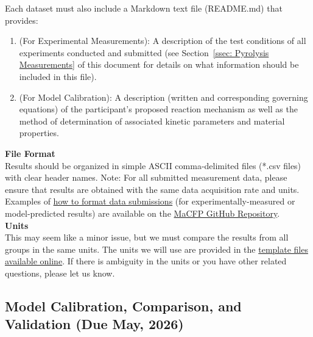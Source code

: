 \documentclass[12pt]{article}
\begin{document}
Each dataset must also include a Markdown text file (README.md) that provides:
\begin{enumerate} [noitemsep]
\item (For Experimental Measurements): A description of the test conditions of all experiments conducted and submitted (see Section~\ref{ssec: Pyrolysis Measurements} of this document for details on what information should be included in this file). 
\item (For Model Calibration): A description (written and corresponding governing equations) of the participant’s proposed reaction mechanism as well as the method of determination of associated kinetic parameters and material properties.
\end{enumerate}

\noindent \textbf{File Format}\\
Results should be organized in simple ASCII comma-delimited files (*.csv files) with clear header names. Note: For all submitted measurement data, please ensure that results are obtained with the same data acquisition rate and units. Examples of \href{https://github.com/MaCFP/matl-db/tree/master/Wood/Calibration_Data/TEMPLATE-INSTITUTE-X}{how to format data submissions} (for experimentally-measured or model-predicted results) are available on the \href{https://github.com/MaCFP/matl-db/tree/master/Wood/Calibration_Data/TEMPLATE-INSTITUTE-X}{MaCFP GitHub Repository}.\\

\noindent \textbf{Units}\\
This may seem like a minor issue, but we must compare the results from all groups in the same units. The units we will use are provided in the \href{https://github.com/MaCFP/matl-db/tree/master/Wood/Calibration_Data/TEMPLATE-INSTITUTE-X}{template files available online}. If there is ambiguity in the units or you have other related questions, please let us know.

\clearpage
\subsection{Model Calibration, Comparison, and Validation (Due May, 2026)}
\end{document}
